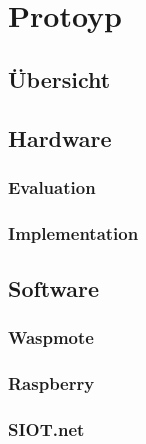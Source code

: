 \chapter{Protoyp}
\section{Übersicht}
\section{Hardware}
\subsection{Evaluation}
\subsection{Implementation}
\section{Software}
\subsection{Waspmote}
\subsection{Raspberry}
\subsection{SIOT.net}
